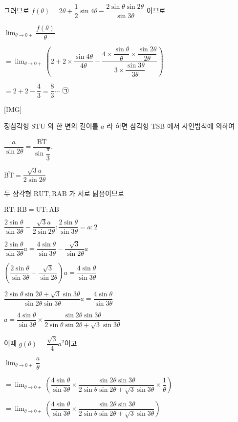 \documentclass{oblivoir}
\begin{document}
그러므로
$f(\theta)=2 \theta+\dfrac{1}{2} \sin 4 \theta-\dfrac{2 \sin \theta \sin 2 \theta}{\sin 3 \theta}$
이므로

$\displaystyle\lim _{\theta \rightarrow 0+} \dfrac{f(\theta)}{\theta}$

$=\displaystyle\lim _{\theta \rightarrow 0+}\left(2+2 \times \dfrac{\sin 4 \theta}{4 \theta}-\dfrac{4 \times \dfrac{\sin \theta}{\theta} \times \dfrac{\sin 2 \theta}{2 \theta}}{3 \times \dfrac{\sin 3 \theta}{3 \theta}}\right)$

$=2+2-\dfrac{4}{3}=\dfrac{8}{3} \cdots$ ㉠

[IMG]

정삼각형 $\mathrm{STU}$ 의 한 변의 길이를 $a$ 라 하면 삼각형 $\mathrm{TSB}$ 에서 사인법칙에 의하여

$\dfrac{a}{\sin 2 \theta}=\dfrac{\overline{\mathrm{BT}}}{\sin \dfrac{\pi}{3}}$,

$\overline{\mathrm{BT}}=\dfrac{\sqrt{3} a}{2 \sin 2 \theta}$

두 삼각형 $\mathrm{RUT}, \mathrm{RAB}$ 가 서로 닮음이므로

$\overline{\mathrm{RT}}: \overline{\mathrm{RB}}=\overline{\mathrm{UT}}: \overline{\mathrm{AB}}$

$\dfrac{2 \sin \theta}{\sin 3 \theta}-\dfrac{\sqrt{3} a}{2 \sin 2 \theta}: \dfrac{2 \sin \theta}{\sin 3 \theta}=a: 2$

$\dfrac{2 \sin \theta}{\sin 3 \theta} a=\dfrac{4 \sin \theta}{\sin 3 \theta}-\dfrac{\sqrt{3}}{\sin 2 \theta} a$

$\left(\dfrac{2 \sin \theta}{\sin 3 \theta}+\dfrac{\sqrt{3}}{\sin 2 \theta}\right) a=\dfrac{4 \sin \theta}{\sin 3 \theta}$

$\dfrac{2 \sin \theta \sin 2 \theta+\sqrt{3} \sin 3 \theta}{\sin 2 \theta \sin 3 \theta} a=\dfrac{4 \sin \theta}{\sin 3 \theta}$

$a=\dfrac{4 \sin \theta}{\sin 3 \theta} \times \dfrac{\sin 2 \theta \sin 3 \theta}{2 \sin \theta \sin 2 \theta+\sqrt{3} \sin 3 \theta}$

이때
$g(\theta)=\dfrac{\sqrt{3}}{4} a^{2}$이고

$\displaystyle\lim _{\theta \rightarrow 0+} \dfrac{a}{\theta}$

$=\displaystyle\lim _{\theta \rightarrow 0+}\left(\dfrac{4 \sin \theta}{\sin 3 \theta} \times \dfrac{\sin 2 \theta \sin 3 \theta}{2 \sin \theta \sin 2 \theta+\sqrt{3} \sin 3 \theta} \times \dfrac{1}{\theta}\right)$

$=\displaystyle\lim _{\theta \rightarrow 0+}\left(\dfrac{4 \sin \theta}{\sin 3 \theta} \times \dfrac{\sin 2 \theta \sin 3 \theta}{2 \sin \theta \sin 2 \theta+\sqrt{3} \sin 3 \theta}\right)$
\end{document}
